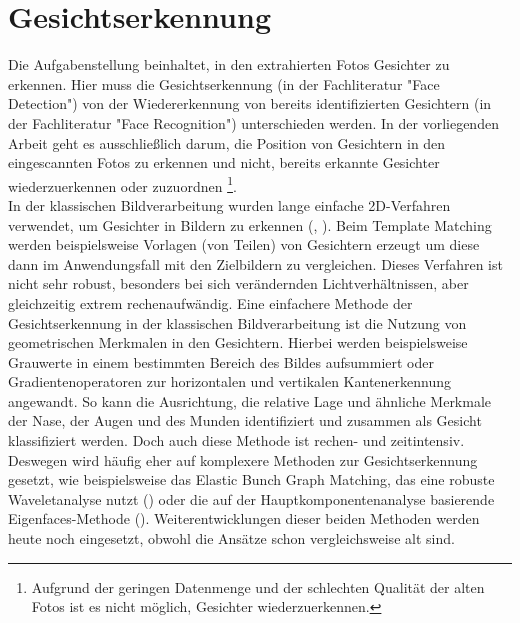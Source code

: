 \chapter{Gesichtserkennung}
Die Aufgabenstellung beinhaltet, in den extrahierten Fotos Gesichter zu erkennen. Hier muss die Gesichtserkennung (in der Fachliteratur "Face Detection") von der Wiedererkennung von bereits identifizierten Gesichtern (in der Fachliteratur "Face Recognition") unterschieden werden. In der vorliegenden Arbeit geht es ausschließlich darum, die Position von Gesichtern in den eingescannten Fotos zu erkennen und nicht, bereits erkannte Gesichter wiederzuerkennen oder zuzuordnen \footnote{Aufgrund der geringen Datenmenge und der schlechten Qualität der alten Fotos ist es nicht möglich, Gesichter wiederzuerkennen.}.\\
In der klassischen Bildverarbeitung wurden lange einfache 2D-Verfahren verwendet, um Gesichter in Bildern zu erkennen (\cite{Kees2012}, \cite{Wachter2001}). Beim Template Matching werden beispielsweise Vorlagen (von Teilen) von Gesichtern erzeugt um diese dann im Anwendungsfall mit den Zielbildern zu vergleichen. Dieses Verfahren ist nicht sehr robust, besonders bei sich verändernden Lichtverhältnissen, aber gleichzeitig extrem rechenaufwändig. Eine einfachere Methode der Gesichtserkennung in der klassischen Bildverarbeitung ist die Nutzung von geometrischen Merkmalen in den Gesichtern. Hierbei werden beispielsweise Grauwerte in einem bestimmten Bereich des Bildes aufsummiert oder Gradientenoperatoren zur horizontalen und vertikalen Kantenerkennung angewandt. So kann die Ausrichtung, die relative Lage und ähnliche Merkmale der Nase, der Augen und des Munden identifiziert und zusammen als Gesicht klassifiziert werden. Doch auch diese Methode ist rechen- und zeitintensiv. Deswegen wird häufig eher auf komplexere Methoden zur Gesichtserkennung gesetzt, wie beispielsweise das Elastic Bunch Graph Matching, das eine robuste Waveletanalyse nutzt (\cite{Wiskott1999}) oder die auf der Hauptkomponentenanalyse basierende Eigenfaces-Methode (\cite{doi:10.1162/jocn.1991.3.1.71}). Weiterentwicklungen dieser beiden Methoden werden heute noch eingesetzt, obwohl die Ansätze schon vergleichsweise alt sind.

